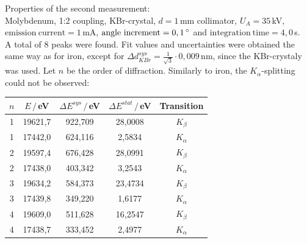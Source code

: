 \documentclass[a4paper,12pt]{article}
\begin{document}
Properties of the second measurement: \\ 
Molybdenum, 1:2 coupling, KBr-crystal, $d=1\,$mm collimator, $U_A=35\,$kV, $\mathrm{emission\ current}=1\,$mA, $\mathrm{angle\ increment}=0,1\,\degree$ and $\mathrm{integration\ time}=4,0\,$s.\\
A total of 8 peaks were found. Fit values and uncertainties were obtained the same way as for iron, except for $\Delta d_{KBr}^{sys}=\frac{1}{\sqrt{3}}\cdot 0,009\,$nm, since the KBr-crystaly was used. 
Let $n$ be the order of diffraction. Similarly to iron, the $K_\alpha$-splitting could not be observed:
\begin{table}[h!]
\centering
\begin{tabular}{c|c|c|c|c}
$n$&$E\,/\,$eV&$\Delta E^{sys}\,/\,$eV&$\Delta E^{stat}\,/\,$eV&Transition \\ \hline
1&19621,7&922,709&28,0008&$K_\beta$\\ \hline
1&17442,0&624,116&2,5834 &$K_\alpha$\\ \hline
2&19597,4&676,428&28,0991&$K_\beta$\\ \hline
2&17438,0&403,342&3,2543 &$K_\alpha$\\ \hline
3&19634,2&584,373&23,4734&$K_\beta$\\ \hline
3&17439,8&349,220&1,6177 &$K_\alpha$\\ \hline
4&19609,0&511,628&16,2547&$K_\beta$\\ \hline
4&17438,7&333,452&2,4977 &$K_\alpha$
\end{tabular}
\end{table}\\
\end{document}
